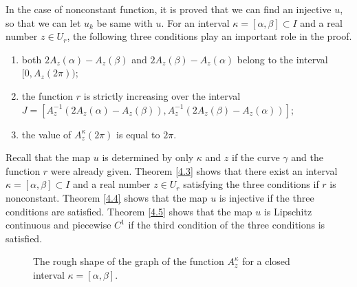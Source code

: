 \documentclass{amsart}
\theoremstyle{plain}
\theoremstyle{definition}
\theoremstyle{remark}
\begin{document}
In the case of nonconstant function, it is proved that we can find an injective $u$, so that we can let $u_k$ be same with $u$.
For an interval $\kappa=[\alpha,\beta]\subset I$ and a real number $z\in U_r$, the following three conditions play an important role in the proof.
\begin{enumerate}
\item both $2A_z(\alpha)-A_z(\beta)$ and $2A_z(\beta)-A_z(\alpha)$ belong to the interval $[0,A_z(2\pi))$;
\item the function $r$ is strictly increasing over the interval $J=[A_z^{-1}(2A_z(\alpha)-A_z(\beta)),A_z^{-1}(2A_z(\beta)-A_z(\alpha))]$;
\item the value of $A_z^{\kappa}(2\pi)$ is equal to $2\pi$.
\end{enumerate}
Recall that the map $u$ is determined by only $\kappa$ and $z$ if the curve $\gamma$ and the function $r$ were already given.
Theorem \ref{4.3} shows that there exist an interval $\kappa=[\alpha,\beta]\subset I$ and a real number $z\in U_r$ satisfying the three conditions if $r$ is nonconstant.
Theorem \ref{4.4} shows that the map $u$ is injective if the three conditions are satisfied.
Theorem \ref{4.5} shows that the map $u$ is Lipschitz continuous and piecewise $C^1$ if the third condition of the three conditions is satisfied.



\begin{figure}[h]%
\caption{The rough shape of the graph of the function $A_z^{\kappa}$ for a closed interval $\kappa=[\alpha,\beta]$.}
\end{figure}
\end{document}
